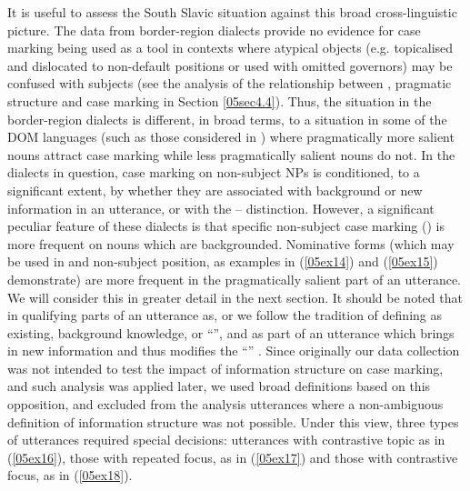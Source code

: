 \documentclass[output=paper,colorlinks,citecolor=brown]{langscibook}
\begin{document}
It is useful to assess the South Slavic situation against this broad cross-linguistic picture. The data from  border-region dialects provide no evidence for case marking being used as a tool in contexts where atypical objects (e.g. topicalised and dislocated to non-default positions or used with omitted governors) may be confused with subjects (see the analysis of the relationship between , pragmatic structure and case marking in Section \ref{05sec4.4}). Thus, the situation in the border-region dialects is different, in broad terms, to a situation in some of the DOM languages (such as those considered in \citealt{aissen2003, malchukov2008}) where pragmatically more salient nouns attract case marking while less pragmatically salient nouns do not. In the  dialects in question, case marking on non-subject NPs is conditioned, to a significant extent, by whether they are associated with background or new information in an utterance, or with the -- distinction. However, a significant peculiar feature of these dialects is that specific non-subject case marking () is more frequent on nouns which are backgrounded. Nominative forms (which may be used in  and non-subject position, as examples in (\ref{05ex14}) and (\ref{05ex15}) demonstrate) are more frequent in the pragmatically salient part of an utterance. We will consider this in greater detail in the next section. It should be noted that in qualifying parts of an utterance as,  or  we follow the tradition of defining  as existing, background knowledge, or ``'', and  as part of an utterance which brings in new information and thus modifies the ``'' \citep{hoopswart2000, krifka2007}. Since originally our data collection was not intended to test the impact of information structure on case marking, and such analysis was applied later, we used broad definitions based on this opposition, and excluded from the analysis utterances where a non-ambiguous definition of information structure was not possible. Under this view, three types of utterances required special decisions: utterances with contrastive topic as in (\ref{05ex16}), those with repeated focus, as in (\ref{05ex17}) and those with contrastive focus, as in (\ref{05ex18}).
\end{document}
